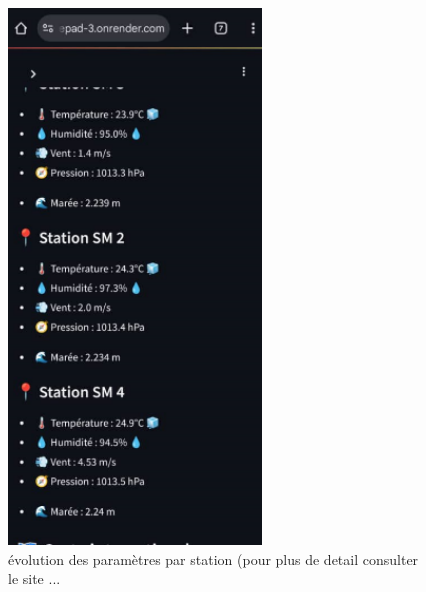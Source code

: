 \documentclass[a4paper,12pt,openany]{report}
\begin{document}
\begin{enumerate}
	\begin{figure}[H]
		\begin{center}
		 \begin{minipage}{\textwidth}
		    \begin{center}
		    \includegraphics[width=0.6\textwidth]{images/site_pad_donne.png}
		    \end{center}
		    \end{minipage}
		\caption{évolution des paramètres par station (pour plus de detail consulter le site ...\label{Fig 3.9}}
		\end{center}
	\end{figure}%
		\begin{figure}[H]
		\begin{center}
				 \begin{minipage}{\textwidth}
				    \begin{center}

\end{center}
\end{minipage}
\end{center}
\end{figure}
\end{enumerate}
\end{document}
